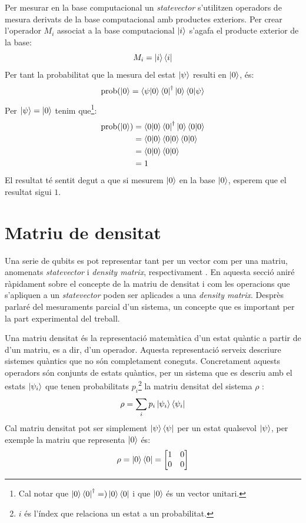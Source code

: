 Per mesurar en la base computacional un \textit{statevector} s'utilitzen operadors de mesura derivats de la base computacional amb productes exteriors. Per crear l'operador ${M_i}$ associat a la base computacional $\ket{i}$ s'agafa el producte exterior de la base:
$$
M_i = \ket{i}\bra{i}
$$
Per tant la probabilitat que la mesura del estat $\ket{\psi}$ resulti en $\ket{0}$, és:
$$
\mathrm{prob}(\ket{0} = \bra{\psi}\ket{0}\bra{0}^\dagger \ket{0}\bra{0}\ket{\psi}
$$
Per $\ket{\psi} = \ket{0}$ tenim que\footnote{Cal notar que $\ket{0}\bra{0}^\dagger =) \ket{0}\bra{0}$ i que $\ket{0}$ és un vector unitari.}:
\begin{align*}
	\mathrm{prob}(\ket{0}) &= \bra{0}\ket{0}\bra{0}^\dagger \ket{0}\bra{0}\ket{0} \\
	&= \bra{0}\ket{0}\bra{0} \ket{0}\bra{0}\ket{0} \\
	&= \bra{0}\ket{0}\bra{0}\ket{0} \\
	&= 1
\end{align*}
El resultat té sentit degut a que si mesurem $\ket{0}$ en la base $\ket{0}$, esperem que el resultat sigui $1$. 

\section{Matriu de densitat}
Una serie de qubits es pot representar tant per un vector com per una matriu, anomenats \textit{statevector} i \textit{density matrix}, respectivament \cite{QCandQI}.
En aquesta secció aniré ràpidament sobre el concepte de la matriu de densitat i com les operacions que s'apliquen a un \textit{statevector} poden ser aplicades a una \textit{density matrix}. Desprès parlaré del mesuraments parcial d'un sistema, un concepte que es important per la part experimental del treball. 

Una matriu densitat és la representació matemàtica d'un estat quàntic a partir de d'un matriu, es a dir, d'un operador. Aquesta representació serveix descriure sistemes quàntics que no són completament coneguts. Concretament aquests operadors són conjunts de estats quàntics, per un sistema que es descriu amb el estats $\ket{\psi_i}$ que tenen probabilitats $p_i$\footnote{$i$ és l'índex que relaciona un estat a un probabilitat.} la matriu densitat del sistema $\rho$ \cite{QCandQI:density_matrix}:
$$
\rho = \sum_i p_i\ket{\psi_i}\bra{\psi_i}
$$
Cal matriu densitat pot ser simplement $\ket{\psi}\bra{\psi}$ per un estat qualsevol $\ket{\psi}$, per exemple la matriu que representa $\ket{0}$ és:
$$
\rho = \ket{0}\bra{0} = \begin{bmatrix}
	1 & 0 \\
	0 & 0 
\end{bmatrix}
$$


